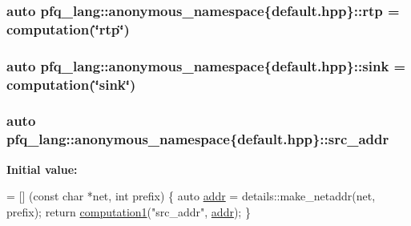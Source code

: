 \hypertarget{namespacepfq__lang_1_1anonymous__namespace_02default_8hpp_03_a13ac072f4d7f860256ef22d7f5a1a9ac}{
\subsubsection[{rtp}]{\setlength{\rightskip}{0pt plus 5cm}auto pfq\-\_\-lang\-::anonymous\-\_\-namespace\{default.\-hpp\}\-::rtp = {\bf computation}(\char`\"{}rtp\char`\"{})}}\label{namespacepfq__lang_1_1anonymous__namespace_02default_8hpp_03_a13ac072f4d7f860256ef22d7f5a1a9ac}
\hypertarget{namespacepfq__lang_1_1anonymous__namespace_02default_8hpp_03_ad708862e729d0cc6a217d86bb25b1061}{
\subsubsection[{sink}]{\setlength{\rightskip}{0pt plus 5cm}auto pfq\-\_\-lang\-::anonymous\-\_\-namespace\{default.\-hpp\}\-::sink = {\bf computation}(\char`\"{}sink\char`\"{})}}\label{namespacepfq__lang_1_1anonymous__namespace_02default_8hpp_03_ad708862e729d0cc6a217d86bb25b1061}
\hypertarget{namespacepfq__lang_1_1anonymous__namespace_02default_8hpp_03_a63c87ff605d7cefa807fd61bc463785d}{
\subsubsection[{src\-\_\-addr}]{\setlength{\rightskip}{0pt plus 5cm}auto pfq\-\_\-lang\-::anonymous\-\_\-namespace\{default.\-hpp\}\-::src\-\_\-addr}}\label{namespacepfq__lang_1_1anonymous__namespace_02default_8hpp_03_a63c87ff605d7cefa807fd61bc463785d}
{\bfseries Initial value\-:}
\begin{DoxyCode}
= [] (\textcolor{keyword}{const} \textcolor{keywordtype}{char} *net, \textcolor{keywordtype}{int} prefix)
        \{
            \textcolor{keyword}{auto} \hyperlink{namespacepfq__lang_1_1anonymous__namespace_02default_8hpp_03_aafce8334d1be83bff9a2115439c8c453}{addr} = details::make\_netaddr(net, prefix);
            \textcolor{keywordflow}{return} \hyperlink{namespacepfq__lang_a58e7e358fc7c95121f74d56c094b1627}{computation1}(\textcolor{stringliteral}{"src\_addr"}, \hyperlink{namespacepfq__lang_1_1anonymous__namespace_02default_8hpp_03_aafce8334d1be83bff9a2115439c8c453}{addr});
        \}
\end{DoxyCode}
